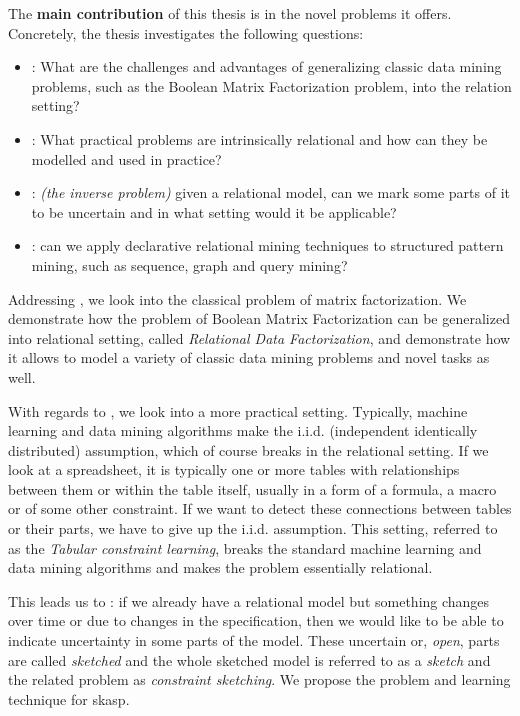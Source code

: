 The \textbf{main contribution} of this thesis is in the novel problems
it offers. Concretely, the thesis investigates the following questions:
\begin{itemize}
  \item \cone: What are the challenges and advantages of generalizing
    classic data mining problems, such as the Boolean Matrix
    Factorization problem, into the relation setting?
  \item \ctwo: What practical problems are intrinsically relational and
    how can they be modelled and used in practice?
  \item \cthree: \textit{(the inverse problem)} given a relational
    model, can we mark some parts of it to be uncertain and in what
    setting would it be applicable?
  \item \cfour: 
    can we apply declarative relational mining
    techniques to structured pattern mining, such as sequence, graph
    and query mining?
\end{itemize}

Addressing \cone, we look into the classical problem of matrix
factorization. We demonstrate how the problem of Boolean Matrix
Factorization can be generalized into relational setting, called
\textit{Relational Data Factorization}, and
demonstrate how it allows to model a variety of classic data mining
problems and novel tasks as well.

With regards to \ctwo, we look into a more practical setting.
Typically, machine learning and data mining algorithms make the i.i.d.
(independent identically distributed) assumption, which of course
breaks in the relational setting. If we look at a spreadsheet, it is
typically one or more tables with relationships between them or
within the table itself, usually
in a form of a formula, a macro or of some other constraint. If we
want to detect these connections between tables or their parts, we
have to give up the i.i.d. assumption. This setting, referred to as the
\textit{Tabular constraint learning}, breaks the standard
machine learning and data mining algorithms and 
makes the problem essentially relational.

This leads us to \cthree: if we already have a relational model but
something changes over time or due to changes in the specification, then we would like
to be able to indicate uncertainty in some parts of the model. These
uncertain or, \textit{open}, parts are called \textit{sketched} and
the whole sketched model is referred to as a \textit{sketch} and the related
problem as \textit{constraint sketching}. We propose the problem and
learning technique for \acrlong{skasp}.


